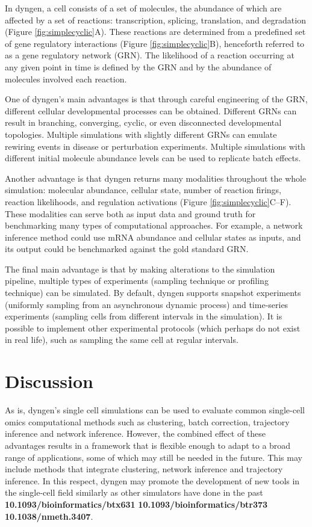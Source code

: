 In dyngen, a cell consists of a set of molecules, the abundance of which are affected by a set of reactions: transcription, splicing, translation, and degradation (Figure \ref{fig:simplecyclic}A). These reactions are determined from a predefined set of gene regulatory interactions (Figure \ref{fig:simplecyclic}B), henceforth referred to as a gene regulatory network (GRN). The likelihood of a reaction occurring at any given point in time is defined by the GRN and by the abundance of molecules involved each reaction.

One of dyngen's main advantages is that through careful engineering of the GRN, different cellular developmental processes can be obtained. Different GRNs can result in branching, converging, cyclic, or even disconnected developmental topologies. Multiple simulations with slightly different GRNs can emulate rewiring events in disease or perturbation experiments. %
Multiple simulations with different initial molecule abundance levels can be used to replicate batch effects. 

Another advantage is that dyngen returns many modalities throughout the whole simulation: molecular abundance, cellular state, number of reaction firings, reaction likelihoods, and regulation activations (Figure \ref{fig:simplecyclic}C--F). These modalities can serve both as input data and ground truth for benchmarking many types of computational approaches. For example, a network inference method could use mRNA abundance and cellular states as inputs, and its output could be benchmarked against the gold standard GRN.

The final main advantage is that by making alterations to the simulation pipeline, multiple types of experiments (sampling technique or profiling technique) can be simulated. By default, dyngen supports snapshot experiments (uniformly sampling from an asynchronous dynamic process) and time-series experiments (sampling cells from different intervals in the simulation). 
It is possible to implement other experimental protocols (which perhaps do not exist in real life), such as sampling the same cell at regular intervals. 

\section{Discussion}
As is, dyngen's single cell simulations can be used to evaluate common single-cell omics computational methods such as clustering, batch correction, trajectory inference and network inference.
However, the combined effect of these advantages results in a framework that is flexible enough to adapt to a broad range of applications, some of which may still be needed in the future. This may include methods that integrate clustering, network inference and trajectory inference. In this respect, dyngen may promote the development of new tools in the single-cell field similarly as other simulators have done in the past \textbf{10.1093/bioinformatics/btx631} \textbf{10.1093/bioinformatics/btr373} \textbf{10.1038/nmeth.3407}.

